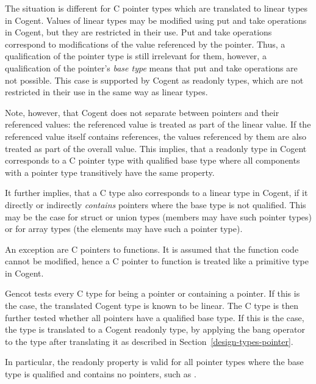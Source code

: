 The situation is different for C pointer types which are translated to linear types in Cogent. Values of linear types
may be modified using put and take operations in Cogent, but they are restricted in their use. Put and take operations
correspond to modifications of the value referenced by the pointer. Thus, a  qualification of the pointer
type is still irrelevant for them, however, a  qualification of the pointer's \textit{base type} means
that put and take operations are not possible. This case is supported by Cogent as readonly types, which are not
restricted in their use in the same way as linear types.

Note, however, that Cogent does not separate between pointers and their referenced values: the referenced value
is treated as part of the linear value. If the referenced value itself contains references, the values referenced
by them are also treated as part of the overall value. This implies, that a readonly type in Cogent corresponds to
a C pointer type with  qualified base type where all components with a pointer type transitively have
the same property.

It further implies, that a C type also corresponds to a linear type in Cogent, if it directly or indirectly 
\textit{contains} pointers where the base type is not  qualified. This may be the case for struct or union
types (members may have such pointer types) or for array types (the elements may have such a pointer type).

An exception are C pointers to functions. It is assumed that the function code cannot be modified, hence a C pointer 
to function is treated like a primitive type in Cogent.

Gencot tests every C type for being a pointer or containing a pointer. If this is the case, the translated Cogent 
type is known to be linear. The C type is then further tested whether all pointers have a  qualified
base type. If this is the case, the type is translated to a Cogent readonly type,
by applying the bang operator \code{!} to the type after translating it as described in Section~\ref{design-types-pointer}.

In particular, the readonly property is valid for all pointer types where the base type is  qualified 
and contains no pointers, such as .

